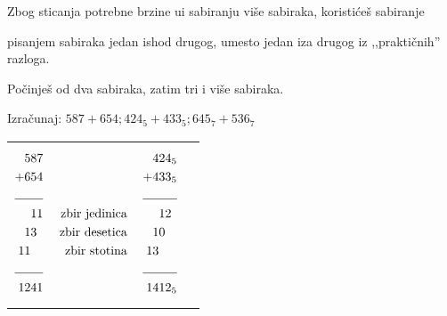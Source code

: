     \begin{zad}

        Zbog sticanja potrebne brzine ui sabiranju vi\v se sabiraka, koristi\' ce\v s sabiranje

        pisanjem sabiraka jedan ishod drugog, umesto jedan iza drugog iz ,,prakti\v cnih'' razloga.



        Po\v cinje\v s od dva sabiraka, zatim tri i vi\v se sabiraka.



        Izra\v cunaj:  $587 + 654; 424_5 + 433_5; 645_7 + 536_7$



        \begin{tabular}{ p{3cm} p{3cm} p{3cm} }

        {\begin{align*}

            5&87& \\

         +  6&54& \\

         \cline{1-2}

            &11 &\text{ zbir jedinica}\\

            1&3 &\text{ zbir desetica}\\

            11& &\text{ zbir stotina}\\ 

        \cline{1-2}

            12&41&

        \end{align*}}

        &

        {\begin{align*}

            4&24_5 \\

         +  4&33_5 \\

         \cline{1-2}

            &12 \\

            1&0 \\

            13& \\ 

        \cline{1-2}

            14&12_5


\end{align*}}
\end{tabular}
\end{zad}
